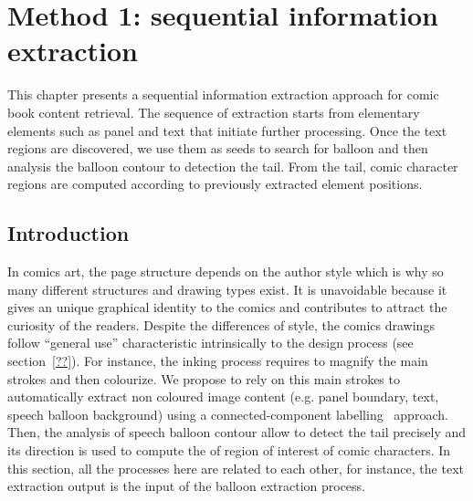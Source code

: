 \chapter{Method 1: sequential information extraction}%
\label{chap:sequential}
\graphicspath{{./chapters/3-sequential/figs/}}

This chapter presents a sequential information extraction approach for comic book content retrieval.
The sequence of extraction starts from elementary elements such as panel and text that initiate further processing.
Once the text regions are discovered, we use them as seeds to search for balloon and then analysis the balloon contour to detection the tail.
From the tail, comic character regions are computed according to previously extracted element positions.


\section{Introduction} %
\label{sec:introduction}

In comics art, the page structure depends on the author style which is why so many different structures and drawing types exist.
It is unavoidable because it gives an unique graphical identity to the comics and contributes to attract the curiosity of the readers.
Despite the differences of style, the comics drawings follow ``general use'' characteristic intrinsically to the design process (see section~\ref{??}).
For instance, the inking process requires to magnify the main strokes and then colourize.
We propose to rely on this main strokes to automatically extract non coloured image content (e.g. panel boundary, text, speech balloon background) using a connected-component labelling~\cite{Szeliski2010Computer} approach.
Then, the analysis of speech balloon contour allow to detect the tail precisely and its direction is used to compute the of region of interest of comic characters.
In this section, all the processes here are related to each other, for instance, the text extraction output is the input of the balloon extraction process.


